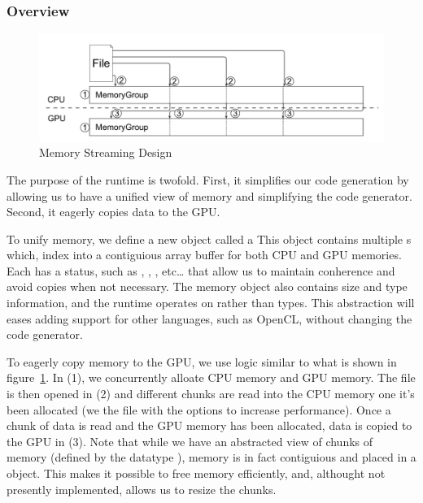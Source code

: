 \subsubsection{Overview}


\begin{figure}
\centering
\includegraphics[scale=0.2]{fig/memory_group.pdf}
\caption{Memory Streaming Design}
\label{fig:memorygroup}
\centering
\end{figure}

The purpose of the runtime is twofold.
First, it simplifies our code generation by allowing us to 
	have a unified view of memory and simplifying the 
	code generator.
Second, it eagerly copies data to the GPU.

To unify memory, we define a new object called a 
This object contains multiple s which,
	index into a contiguious array buffer for both CPU and GPU memories.
Each  has a status, such as
	, ,
	, etc\ldots
	that allow us to maintain conherence and avoid copies when
	not necessary.
The memory object also contains size and type information,
	and the runtime operates on  rather than 
	types.
This abstraction will eases adding support for other languages, such 
	as OpenCL, without changing the code generator.

To eagerly copy memory to the GPU, we use logic similar to what is
	shown in figure~\ref{fig:memorygroup}.
In (1), we concurrently alloate CPU memory and GPU memory.
The file is then opened in (2) and different chunks are read into
	the CPU memory one it's been allocated (we  the file
	with the  options to increase
	performance).
Once a chunk of data is read and the GPU memory has been allocated, data 
	is copied to the GPU in (3).
Note that while we have an abstracted view of chunks of memory 
	(defined by the datatype ), memory is in fact
	contiguious and placed in a  object.
This makes it possible to free memory efficiently, and, althought
	not presently implemented, allows us to resize the chunks.
